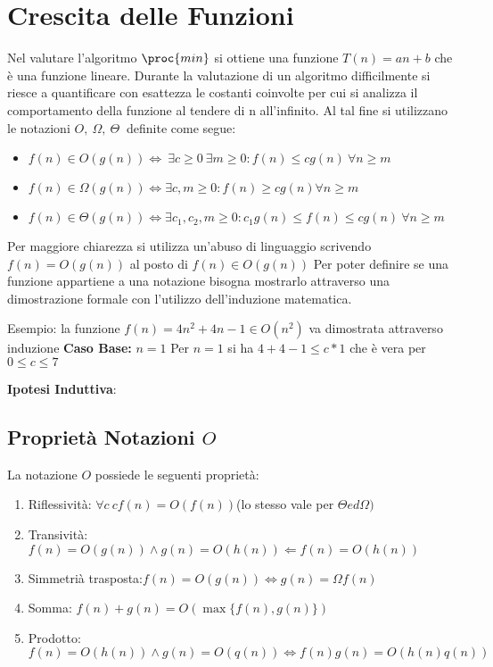 \chapter{Crescita delle Funzioni}
Nel valutare l'algoritmo $\proc{min}$ si ottiene una funzione $T(n) = an + b$ che
è una funzione lineare.\newline
Durante la valutazione di un algoritmo difficilmente si riesce a quantificare con
esattezza le costanti coinvolte per cui si analizza il comportamento della funzione
al tendere di n all'infinito.\newline
Al tal fine si utilizzano le notazioni $O,\ \Omega,\ \Theta\ $ definite come segue:

\begin{itemize}
  \item $f(n) \in O(g(n)) \Leftrightarrow\ \exists c \geq 0\ \exists m \geq 0 : f(n) \leq cg(n)\ \forall n \geq m$
  \item $f(n) \in \Omega(g(n)) \Leftrightarrow \exists c, m \geq 0 : f(n) \geq cg(n) \forall n \geq m$
  \item $f(n) \in \Theta(g(n)) \Leftrightarrow \exists c_1,c_2,m \geq 0 :
        c_1g(n) \leq f(n) \leq cg(n)\ \forall n \geq m$
\end{itemize}
Per maggiore chiarezza si utilizza un'abuso di linguaggio scrivendo $f(n) = O(g(n))$
al posto di $f(n) \in O(g(n))$\newline
Per poter definire se una funzione appartiene a una notazione bisogna mostrarlo attraverso
una dimostrazione formale con l'utilizzo dell'induzione matematica.\newline

Esempio: la funzione $f(n) = 4n^2 + 4n - 1 \in O(n^2)$ va dimostrata attraverso induzione\newline
\textbf{Caso Base:} $n = 1$\newline
Per $n = 1$ si ha $4 + 4 -1 \leq c * 1$ che è vera per $0 \leq c \leq 7$\newline

\textbf{Ipotesi Induttiva}:

\section{Proprietà Notazioni $O$}
La notazione $O$ possiede le seguenti proprietà:
\begin{enumerate}
  \item Riflessività: $\forall c\ cf(n) = O(f(n))$(lo stesso vale per $\Theta ed \Omega)$
  \item Transività:$f(n) = O(g(n)) \land g(n) = O(h(n)) \Leftarrow f(n) = O(h(n))$
  \item Simmetrià trasposta:$f(n) = O(g(n)) \Leftrightarrow g(n) = \Omega f(n)$
  \item Somma: $f(n) + g(n) = O(\max\{f(n),g(n)\})$
  \item Prodotto: $f(n) = O(h(n)) \land g(n) = O(q(n)) \Leftrightarrow f(n)g(n) = O(h(n)q(n))$
\end{enumerate}

